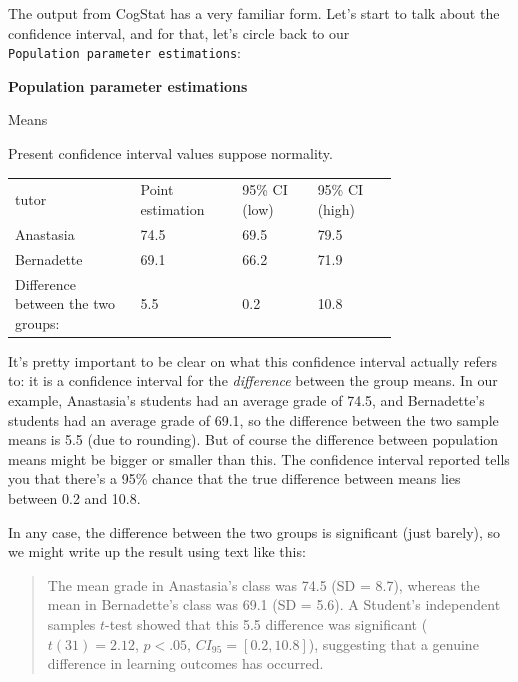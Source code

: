 \documentclass[
  11pt,
  a4paper,
  twoside,symmetric,openright]{book}
\theoremstyle{break}
\theoremstyle{break}
\begin{document}
The output from CogStat has a very familiar form. Let's start to talk about the confidence interval, and for that, let's circle back to our \texttt{Population\ parameter\ estimations}:

\begin{tcolorbox}[colback=white,
  colframe=lightgray,
  coltext=black,
  boxsep=4pt,
  boxrule=0.3pt,
  arc=0pt]
  {  \sffamily
     \color{CSblue}\textbf{Population parameter estimations}

    \color{black}
    Means
    
    Present confidence interval values suppose normality.

    \begin{longtable}[l]{m{0.25\linewidth}p{0.2\linewidth}p{0.15\linewidth}p{0.16\linewidth}}
    \endhead
    tutor
    & Point estimation 
    & 95\% CI (low) 
    & 95\% CI (high) \\
    Anastasia & 74.5 & 69.5 & 79.5 \\
    Bernadette & 69.1 & 66.2 & 71.9 \\
    Difference between the two groups: & 5.5 & 0.2 & 10.8 \\
    \end{longtable}
  }
\end{tcolorbox}

It's pretty important to be clear on what this confidence interval actually refers to: it is a confidence interval for the \emph{difference} between the group means. In our example, Anastasia's students had an average grade of 74.5, and Bernadette's students had an average grade of 69.1, so the difference between the two sample means is 5.5 (due to rounding). But of course the difference between population means might be bigger or smaller than this. The confidence interval reported tells you that there's a 95\% chance that the true difference between means lies between 0.2 and 10.8.

In any case, the difference between the two groups is significant (just barely), so we might write up the result using text like this:

\begin{quote}
The mean grade in Anastasia's class was 74.5 (SD = 8.7), whereas the mean in Bernadette's class was 69.1 (SD = 5.6). A Student's independent samples \(t\)-test showed that this 5.5 difference was significant (\(t(31) = 2.12\), \(p<.05\), \(CI_{95} = [0.2, 10.8]\)), suggesting that a genuine difference in learning outcomes has occurred.
\end{quote}
\end{document}
